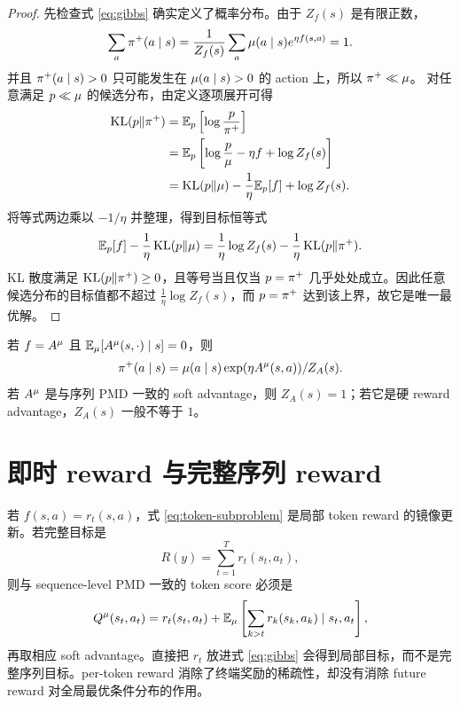 \begin{proof}
先检查式 \eqref{eq:gibbs} 确实定义了概率分布。由于 $Z_f(s)$ 是有限正数，
\[
\sum_a\pi^+(a\mid s)
=\frac{1}{Z_f(s)}\sum_a\mu(a\mid s)e^{\eta f(s,a)}=1.
\]
并且 $\pi^+(a\mid s)>0$ 只可能发生在 $\mu(a\mid s)>0$ 的 action 上，所以 $\pi^+\ll\mu$。
对任意满足 $p\ll\mu$ 的候选分布，由定义逐项展开可得
\begin{align*}
\operatorname{KL}(p\Vert\pi^+)
&=\mathbb{E}_p\left[\log\frac{p}{\pi^+}\right]\\
&=\mathbb{E}_p\left[\log\frac{p}{\mu}
      -\eta f+\log Z_f(s)\right]\\
&=\operatorname{KL}(p\Vert\mu)-\frac1\eta\mathbb{E}_p[f]+\log Z_f(s).
\end{align*}
将等式两边乘以 $-1/\eta$ 并整理，得到目标恒等式
\begin{equation*}
\mathbb{E}_p[f]-\frac1\eta\operatorname{KL}(p\Vert\mu)
=\frac1\eta\log Z_f(s)-\frac1\eta\operatorname{KL}(p\Vert\pi^+).
\end{equation*}
KL 散度满足 $\operatorname{KL}(p\Vert\pi^+)\geq0$，且等号当且仅当 $p=\pi^+$ 几乎处处成立。因此任意候选分布的目标值都不超过 $\frac1\eta\log Z_f(s)$，而 $p=\pi^+$ 达到该上界，故它是唯一最优解。
\end{proof}

\begin{corollary}[优势形式]
若 $f=A^\mu$ 且 $\mathbb{E}_{\mu}[A^\mu(s,\cdot)\mid s]=0$，则
\[
\pi^+(a\mid s)=\mu(a\mid s)\exp(\eta A^\mu(s,a)) / Z_A(s).
\]
若 $A^\mu$ 是与序列 PMD 一致的 soft advantage，则 $Z_A(s)=1$；若它是硬 reward advantage，$Z_A(s)$ 一般不等于 $1$。
\end{corollary}

\section{即时 reward 与完整序列 reward}
\label{sec:immediate-vs-return}

若 $f(s,a)=r_t(s,a)$，式 \eqref{eq:token-subproblem} 是局部 token reward 的镜像更新。若完整目标是
\[
R(y)=\sum_{t=1}^{T}r_t(s_t,a_t),
\]
则与 sequence-level PMD 一致的 token score 必须是
\[
Q^\mu(s_t,a_t)=r_t(s_t,a_t)+\mathbb{E}_\mu\left[\sum_{k>t}r_k(s_k,a_k)\mid s_t,a_t\right],
\]
再取相应 soft advantage。直接把 $r_t$ 放进式 \eqref{eq:gibbs} 会得到局部目标，而不是完整序列目标。per-token reward 消除了终端奖励的稀疏性，却没有消除 future reward 对全局最优条件分布的作用。
